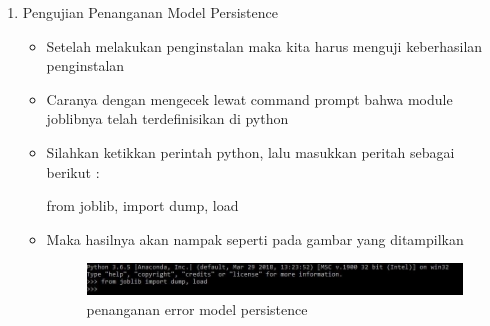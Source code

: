 \par
\begin{enumerate}
\item Pengujian Penanganan Model Persistence
\begin{itemize}
\item Setelah melakukan penginstalan maka kita harus menguji keberhasilan penginstalan
\item Caranya dengan mengecek lewat command prompt bahwa module joblibnya telah terdefinisikan di python
\item Silahkan ketikkan perintah python, lalu masukkan peritah sebagai berikut :
\par from joblib, import dump, load
\par
\item Maka hasilnya akan nampak seperti pada gambar yang ditampilkan

\begin{figure}[ht]
\centering
\includegraphics[scale=0.5]{figures/penanganan2.jpg}
\caption{penanganan error model persistence }
\label{contoh}
\end{figure}

\par
\end{itemize}
\end{enumerate}